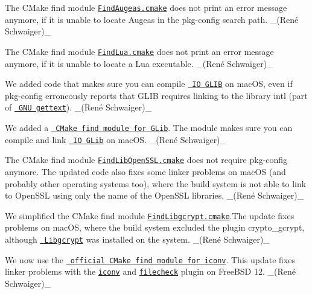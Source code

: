 \begin{DoxyItemize}
\item The C\+Make find module \href{https://master.libelektra.org/scripts/cmake/Modules/FindAugeas.cmake}{\texttt{ {\ttfamily Find\+Augeas.\+cmake}}} does not print an error message anymore, if it is unable to locate Augeas in the {\ttfamily pkg-\/config} search path. \+\_\+(René Schwaiger)\+\_\+
\item The C\+Make find module \href{https://master.libelektra.org/scripts/cmake/Modules/FindLua.cmake}{\texttt{ {\ttfamily Find\+Lua.\+cmake}}} does not print an error message anymore, if it is unable to locate a Lua executable. \+\_\+(René Schwaiger)\+\_\+
\item We added code that makes sure you can compile \href{https://www.libelektra.org/bindings/io_glib}{\texttt{ IO G\+L\+IB}} on mac\+OS, even if {\ttfamily pkg-\/config} erroneously reports that G\+L\+IB requires linking to the library {\ttfamily intl} (part of \href{https://www.gnu.org/software/gettext}{\texttt{ G\+NU gettext}}). \+\_\+(René Schwaiger)\+\_\+
\item We added a \href{https://master.libelektra.org/scripts/cmake/Modules/FindGLib.cmake}{\texttt{ C\+Make find module for G\+Lib}}. The module makes sure you can compile and link \href{https://www.libelektra.org/bindings/io_glib}{\texttt{ IO G\+Lib}} on mac\+OS. \+\_\+(René Schwaiger)\+\_\+
\item The C\+Make find module \href{https://master.libelektra.org/scripts/cmake/Modules/FindLibOpenSSL.cmake}{\texttt{ {\ttfamily Find\+Lib\+Open\+S\+S\+L.\+cmake}}} does not require {\ttfamily pkg-\/config} anymore. The updated code also fixes some linker problems on mac\+OS (and probably other operating systems too), where the build system is not able to link to Open\+S\+SL using only the name of the Open\+S\+SL libraries. \+\_\+(René Schwaiger)\+\_\+
\item We simplified the C\+Make find module \href{https://master.libelektra.org/scripts/cmake/Modules/FindLibgcrypt.cmake}{\texttt{ {\ttfamily Find\+Libgcrypt.\+cmake}}}.The update fixes problems on mac\+OS, where the build system excluded the plugin {\ttfamily crypto\+\_\+gcrypt}, although \href{https://gnupg.org/software/libgcrypt}{\texttt{ Libgcrypt}} was installed on the system. \+\_\+(René Schwaiger)\+\_\+
\item We now use the \href{https://github.com/Kitware/CMake/blob/master/Modules/FindIconv.cmake}{\texttt{ official C\+Make find module for {\ttfamily iconv}}}. This update fixes linker problems with the \href{http://libelektra.org/plugins/iconv}{\texttt{ {\ttfamily iconv}}} and \href{http://libelektra.org/plugins/filecheck}{\texttt{ {\ttfamily filecheck}}} plugin on Free\+B\+SD 12. \+\_\+(René Schwaiger)\+\_\+

\end{DoxyItemize}
